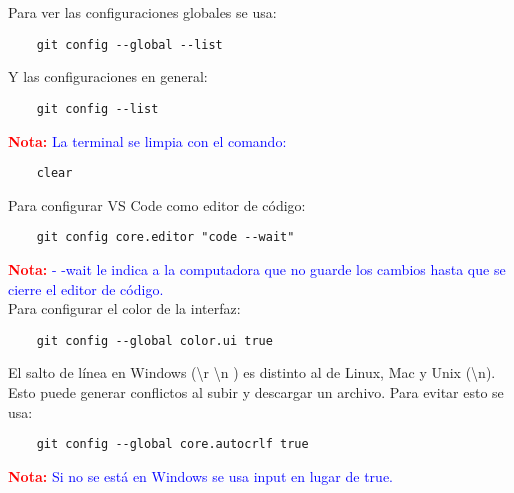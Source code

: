 \documentclass[10pt,oneside]{article}
\begin{document}
\begin{multicols}{2}
Para ver las configuraciones globales se usa:
\begin{verbatim}
    git config --global --list
\end{verbatim}
Y las configuraciones en general:
\begin{verbatim}
    git config --list
\end{verbatim}
\textbf{\textcolor{red}{Nota:}} \textcolor{blue}{La terminal se limpia con el comando:}
\begin{verbatim}
    clear
\end{verbatim}
Para configurar VS Code como editor de código:
\begin{verbatim}
    git config core.editor "code --wait"
\end{verbatim}
\textbf{\textcolor{red}{Nota:}} \textcolor{blue}{- -wait le indica a la computadora que no guarde los cambios hasta que se cierre el editor de código.}\\ \newline
Para configurar el color de la interfaz:
\begin{verbatim}
    git config --global color.ui true
\end{verbatim}
El salto de línea en Windows (\textbackslash r \textbackslash n ) es distinto al de Linux, Mac y Unix (\textbackslash n). Esto puede generar conflictos al subir y descargar un archivo. Para evitar esto se usa:
\begin{verbatim}
    git config --global core.autocrlf true
\end{verbatim}
\textbf{\textcolor{red}{Nota:}} \textcolor{blue}{Si no se está en Windows se usa input en lugar de true. }

\end{multicols}
\end{document}
